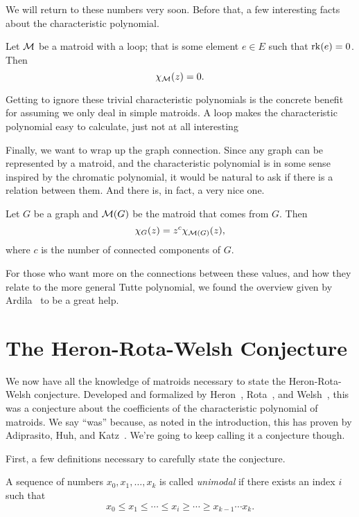 \documentclass[12pt,oneside]{../../sfsuthesis}
\begin{document}
We will return to these numbers very soon.
Before that, a few interesting facts about the characteristic polynomial.

\begin{proposition}
    Let \( \mathcal{M} \) be a matroid with a loop; that is some element \( e \in E \) such that \( \operatorname{rk}(e) = 0 \).
    Then
    \[
        \chi_{\mathcal{M}}(z) = 0.
    \]
\end{proposition}
Getting to ignore these trivial characteristic polynomials is the concrete benefit for assuming we only deal in simple matroids.
A loop makes the characteristic polynomial easy to calculate, just not at all interesting

Finally, we want to wrap up the graph connection.
Since any graph can be represented by a matroid, and the characteristic polynomial is in some sense inspired by the chromatic polynomial, it would be natural to ask if there is a relation between them.
And there is, in fact, a very nice one.

\begin{proposition}
    Let \( G \) be a graph and \( \mathcal{M}(G) \) be the matroid that comes from \( G \).
    Then
    \[
        \chi_G(z) = z^c \chi_{\mathcal{M}(G)}(z),
    \]
    where \( c \) is the number of connected components of \( G \).
\end{proposition}

For those who want more on the connections between these values, and how they relate to the more general Tutte polynomial, we found the overview given by Ardila~\cite{ardilaTuttePolynomialsHyperplane2022} to be a great help.

\section{The Heron-Rota-Welsh Conjecture}

We now have all the knowledge of matroids necessary to state the Heron-Rota-Welsh conjecture.
Developed and formalized by Heron~\cite{heronMatroidPolynomials1972}, Rota~\cite{rotaCombinatorialTheoryOld1970}, and Welsh~\cite{welshMatroidTheory1976}, this was a conjecture about the coefficients of the characteristic polynomial of matroids.
We say ``was'' because, as noted in the introduction, this has proven by Adiprasito, Huh, and Katz~\cite{adiprasitoHodgeTheoryCombinatorial2018}.
We're going to keep calling it a conjecture though.

First, a few definitions necessary to carefully state the conjecture.

\begin{definition}[Unimodal]\th\label{def:unimodal}
    A sequence of numbers \( x_0, x_1, \dots, x_k \) is called \emph{unimodal} if there exists an index \( i \) such that
    \[
        x_0 \leq x_1 \leq \cdots \leq x_i \geq \cdots \geq x_{k-1} \cdots x_k.
    \]

\end{definition}
\end{document}
